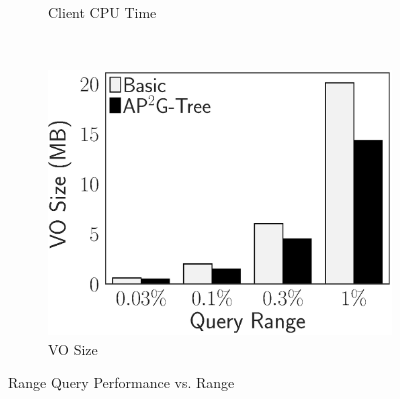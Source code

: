 \begin{figure}[t]
\begin{subfigure}{.33\linewidth}
        \caption{Client CPU Time}
    \end{subfigure}~%
    \begin{subfigure}{.33\linewidth}
        \includegraphics[height=\ht\figbox]{exp-figs/access-control/range_vo.eps}
        \caption{VO Size}
    \end{subfigure}
    \caption{Range Query Performance vs. Range}\label{exp-fig:access-control:range}
\end{figure}

